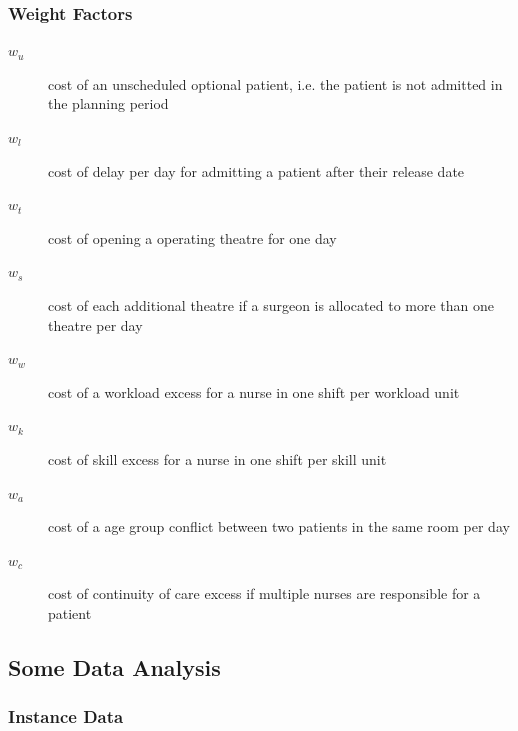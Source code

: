 \begin{frame}
\frametitle{Weight Factors}
\begin{description}
\item[$w_{u}$] cost of an unscheduled optional patient, i.e. the patient is not admitted in the planning period
\item[$w_{l}$] cost of delay per day for admitting a patient after their release date
\item[$w_{t}$] cost of opening a operating theatre for one day
\item[$w_{s}$] cost of each additional theatre if a surgeon is allocated to more than one theatre per day
\item[$w_{w}$] cost of a workload excess for a nurse in one shift per workload unit
\item[$w_{k}$] cost of skill excess for a nurse in one shift per skill unit
\item[$w_{a}$] cost of a age group conflict between two patients in the same room per day
\item[$w_{c}$] cost of continuity of care excess if multiple nurses are responsible for a patient
\end{description}
\end{frame}




\subsection{Some Data Analysis}

\begin{frame}
\frametitle{Instance Data}
\scalebox{0.7}{

}
\end{frame}

% 

% 

% 

